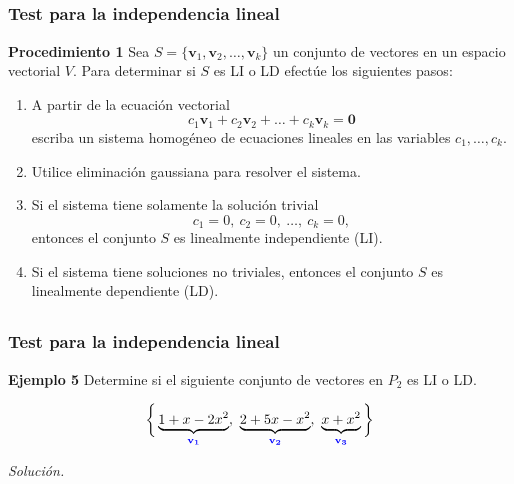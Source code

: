 
\subsection{}

{\nologo
\begin{frame}\frametitle{Test para la independencia lineal}

\begin{ejem}{\textbf{Procedimiento 1}}
	Sea $S=\{\mathbf{v}_1,\mathbf{v}_2,\hdots,\mathbf{v}_k\}$ un conjunto de vectores
	en un espacio vectorial $V$. Para determinar si $S$ es LI o LD efectúe los siguientes pasos:
	\begin{enumerate}
		\item[\labelname{$a$}] A partir de la ecuación vectorial
		\[
			c_1\mathbf{v}_1+c_2\mathbf{v}_2+\hdots+c_k\mathbf{v}_k = \mathbf{0}
		\]
		escriba un sistema homogéneo de ecuaciones lineales en las variables $c_1,\hdots,c_k$.
		\item[\labelname{$b$}] Utilice eliminación gaussiana para resolver el sistema.
		\item[\labelname{$c$}] Si el sistema tiene solamente la solución trivial 
		\[	
			c_1 =0,\ c_2 =0,\ \hdots,\ c_k=0,
		\]
		entonces el conjunto $S$ es linealmente independiente (LI).
		\item[\labelname{$d$}] Si el sistema tiene soluciones no triviales, entonces el conjunto $S$ es linealmente dependiente (LD). 
	\end{enumerate}
\end{ejem}	

\end{frame}
}


\subsection{}

\begin{frame}\frametitle{Test para la independencia lineal}

\begin{ej}{\textbf{Ejemplo 5}} \justifying
	Determine si el siguiente conjunto de vectores en $P_2$ es LI o LD.
	
	\vspace{-2mm}
	\[
		\bigg\{ \underbrace{1+x-2x^2}_{\color{blue}\mathbf{v_1}},\ \underbrace{2+5x-x^2}_{\color{blue}\mathbf{v_2}},
		\ \underbrace{x+x^2}_{\color{blue}\mathbf{v_3}} \bigg\}
	\]
\end{ej}	
\textit{Solución.}

\end{frame}

